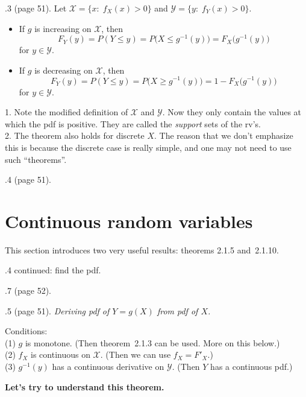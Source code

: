 \documentclass[12pt]{article}
\begin{document}
.3 (page 51).
Let $\mathcal{X} = \{x:\; f_X(x) > 0\}$
and $\mathcal{Y} = \{y:\; f_Y(x) > 0\}$.\\
\begin{itemize}
\item
If $g$ is increasing on $\mathcal{X}$, then
    \[
    F_Y(y)
     = P(Y \le y)
     = P\bigl(X \le g^{-1}(y)\bigr)
     = F_X\bigl(g^{-1}(y)\bigr)
    \]
    for $y \in \mathcal{Y}$.
\item
If $g$ is decreasing on $\mathcal{X}$, then
    \[
    F_Y(y)
     = P(Y \le y)
     = P\bigl(X \ge g^{-1}(y)\bigr)
     = 1 - F_X\bigl(g^{-1}(y)\bigr)
    \]
    for $y \in \mathcal{Y}$.
\end{itemize}

\alert
1. Note the modified definition of $\mathcal{X}$ and $\mathcal{Y}$.
Now they only contain the values at which the pdf is positive.
They are called the \emph{support} sets of the rv's.
\\
2. The theorem also holds for discrete $X$.
The reason that we don't emphasize this is because the discrete case is
really simple, and one may not need to use such ``theorems''.

.4 (page 51).

\section{Continuous random variables}

This section introduces two very useful results:
theorems 2.1.5 and~2.1.10.

.4 continued: find the pdf.

.7 (page 52).

.5 (page 51). \emph{Deriving pdf of $Y = g(X)$ from pdf of $X$.}

Conditions:
\\
(1) $g$ is monotone.
(Then theorem~2.1.3 can be used. More on this below.)
\\
(2) $f_X$ is continuous on $\mathcal{X}$.
(Then we can use $f_X = F'_X$.)
\\
(3) $g^{-1}(y)$ has a continuous derivative on $\mathcal{Y}$.
(Then $Y$ has a continuous pdf.)

\textbf{Let's try to understand this theorem.}
\end{document}
